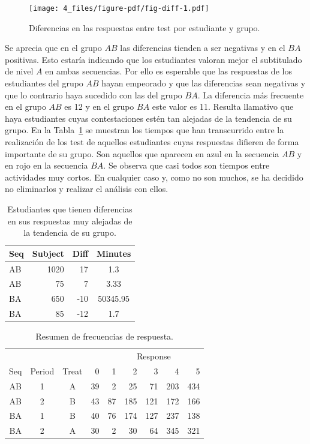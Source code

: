 \documentclass[
  12pt,
  a4paper,
  extrafontsizes,
  onecolumn,
  openright,
  table]{memoir}
\begin{document}
\begin{figure}[h]

{\centering \texttt{[image: 4\_files/figure-pdf/fig-diff-1.pdf]}

}

\caption{\label{fig-diff}Diferencias en las respuestas entre test por
estudiante y grupo.}

\end{figure}

Se aprecia que en el grupo \(AB\) las diferencias tienden a ser
negativas y en el \(BA\) positivas. Esto estaría indicando que los
estudiantes valoran mejor el subtitulado de nivel \(A\) en ambas
secuencias. Por ello es esperable que las respuestas de los estudiantes
del grupo \(AB\) hayan empeorado y que las diferencias sean negativas y
que lo contrario haya sucedido con las del grupo \(BA\). La diferencia
más frecuente en el grupo \(AB\) es 12 y en el grupo \(BA\) este valor
es 11. Resulta llamativo que haya estudiantes cuyas contestaciones estén
tan alejadas de la tendencia de su grupo. En la Tabla~\ref{tbl-diff} se
muestran los tiempos que han transcurrido entre la realización de los
test de aquellos estudiantes cuyas respuestas difieren de forma
importante de su grupo. Son aquellos que aparecen en azul en la
secuencia \(AB\) y en rojo en la secuencia \(BA\). Se observa que casi
todos son tiempos entre actividades muy cortos. En cualquier caso y,
como no son muchos, se ha decidido no eliminarlos y realizar el análisis
con ellos.

\hypertarget{tbl-diff}{}
\begin{longtable}{lrrc}
\caption{\label{tbl-diff}Estudiantes que tienen diferencias en sus respuestas muy alejadas de la
tendencia de su grupo. }\tabularnewline

\toprule
Seq & Subject & Diff & Minutes \\ 
\midrule
AB & 1020 & 17 & 1.3 \\ 
AB & 75 & 7 & 3.33 \\ 
BA & 650 & -10 & 50345.95 \\ 
BA & 85 & -12 & 1.7 \\ 
\bottomrule
\end{longtable}

\hypertarget{tbl-resume}{}
\begin{longtable}{cccrrrrrr}
\caption{\label{tbl-resume}Resumen de frecuencias de respuesta. }\tabularnewline

\toprule
 &  &  &  & \multicolumn{5}{c}{Response} \\ 
\cmidrule(lr){5-9}
Seq & Period & Treat & 0 & 1 & 2 & 3 & 4 & 5 \\ 
\midrule
AB & 1 & A & 39 & 2 & 25 & 71 & 203 & 434 \\ 
AB & 2 & B & 43 & 87 & 185 & 121 & 172 & 166 \\ 
BA & 1 & B & 40 & 76 & 174 & 127 & 237 & 138 \\ 
BA & 2 & A & 30 & 2 & 30 & 64 & 345 & 321 \\ 
\bottomrule
\end{longtable}
\end{document}
